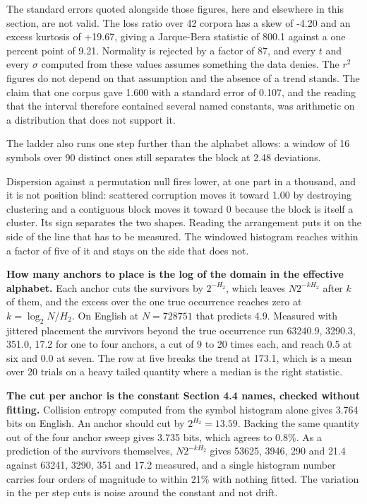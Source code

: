The standard errors quoted alongside those figures, here and elsewhere in this section, are not valid. The loss ratio over 42 corpora has a skew of -4.20 and an excess kurtosis of +19.67, giving a Jarque-Bera statistic of 800.1 against a one percent point of 9.21. Normality is rejected by a factor of 87, and every \(t\) and every \(\sigma\) computed from these values assumes something the data denies. The \(r^2\) figures do not depend on that assumption and the absence of a trend stands. The claim that one corpus gave 1.600 with a standard error of 0.107, and the reading that the interval therefore contained several named constants, was arithmetic on a distribution that does not support it.

The ladder also runs one step further than the alphabet allows: a window of 16 symbols over 90 distinct ones still separates the block at 2.48 deviations.

Dispersion against a permutation null fires lower, at one part in a thousand, and it is not position blind: scattered corruption moves it toward 1.00 by destroying clustering and a contiguous block moves it toward 0 because the block is itself a cluster. Its sign separates the two shapes. Reading the arrangement puts it on the side of the line that has to be measured. The windowed histogram reaches within a factor of five of it and stays on the side that does not.

\textbf{How many anchors to place is the log of the domain in the effective alphabet.} Each anchor cuts the survivors by \(2^{-H_2}\), which leaves \(N 2^{-kH_2}\) after \(k\) of them, and the excess over the one true occurrence reaches zero at \(k = \log_2 N / H_2\). On English at \(N = 728751\) that predicts 4.9. Measured with jittered placement the survivors beyond the true occurrence run 63240.9, 3290.3, 351.0, 17.2 for one to four anchors, a cut of 9 to 20 times each, and reach 0.5 at six and 0.0 at seven. The row at five breaks the trend at 173.1, which is a mean over 20 trials on a heavy tailed quantity where a median is the right statistic.

\textbf{The cut per anchor is the constant Section 4.4 names, checked without fitting.} Collision entropy computed from the symbol histogram alone gives 3.764 bits on English. An anchor should cut by \(2^{H_2} = 13.59\). Backing the same quantity out of the four anchor sweep gives 3.735 bits, which agrees to 0.8\%. As a prediction of the survivors themselves, \(N 2^{-kH_2}\) gives 53625, 3946, 290 and 21.4 against 63241, 3290, 351 and 17.2 measured, and a single histogram number carries four orders of magnitude to within 21\% with nothing fitted. The variation in the per step cuts is noise around the constant and not drift.

